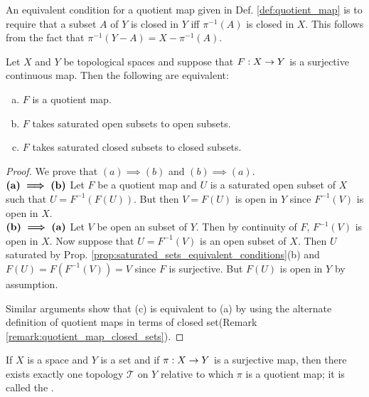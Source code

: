 \documentclass[11pt,a4paper]{article}
\begin{document}
\begin{remark}\label{remark:quotient_map_closed_sets}
An equivalent condition for a quotient map given in Def. \ref{def:quotient_map} is to require that a subset $A$ of $Y$ is closed in $Y$ iff $\pi^{-1}(A)$ is closed in $X$. This follows from the fact that $\pi^{-1}(Y-A) = X - \pi^{-1}(A)$.
\end{remark}

\begin{prop}\label{prop:quotient_map_equivalent_conditions}
Let $X$ and $Y$ be topological spaces and suppose that $F:X\rightarrow Y$ is a surjective continuous map. Then the following are equivalent:
\begin{enumerate}[(a)]
    \item $F$ is a quotient map.
    \item $F$ takes saturated open subsets to open subsets.
    \item $F$ takes saturated closed subsets to closed subsets.
\end{enumerate}
\end{prop}

\begin{proof}
We prove that $(a) \implies (b)$ and $(b)\implies (a)$.\\
$\textbf{(a)}\boldsymbol{\implies}\textbf{(b)}$ Let $F$ be a quotient map and $U$ is a saturated open subset of $X$ such that $U = F^{-1}(F(U))$. But then $V = F(U)$ is open in $Y$ since $F^{-1}(V)$ is open in $X$.\\
$\textbf{(b)}\boldsymbol{\implies}\textbf{(a)}$ Let $V$ be open an subset of $Y$. Then by continuity of $F$, $F^{-1}(V)$ is open in $X$. Now suppose that $U = F^{-1}(V)$ is an open subset of $X$. Then $U$ saturated by Prop. \ref{prop:saturated_sets_equivalent_conditions}(b) and $F(U) = F(F^{-1}(V)) = V$ since $F$ is surjective. But $F(U)$ is open in $Y$ by assumption.

Similar arguments show that (c) is equivalent to (a) by using the alternate definition of quotient maps in terms of closed set(Remark \ref{remark:quotient_map_closed_sets}). 
\end{proof}

\begin{prop}\label{prop:quotient_topology_uniqueness}
If $X$ is a space and $Y$ is a set and if $\pi:X\rightarrow Y$ is a surjective map, then there exists exactly one topology $\mathcal{T}$ on $Y$ relative to which $\pi$ is a quotient map; it is called the .
\end{prop}
\end{document}
